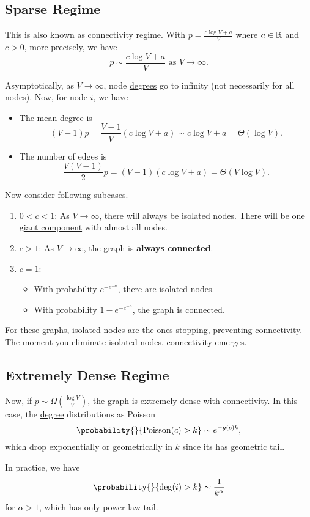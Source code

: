 \subsection{Sparse Regime}\label{subsec:sparse-regime}
This is also known as connectivity regime. With \(p = \frac{c\log V + a}{V}\) where \(a\in\mathbb{\MakeUppercase{R}}\) and \(c>0\),
more precisely, we have
\[
	p\sim \frac{c\log V + a}{V} \text{ as }V\to \infty.
\]

Asymptotically, as \(V\to \infty \), node \hyperref[def:degree]{degrees} go to infinity (not necessarily for all nodes). Now, for node \(i\), we have
\begin{itemize}
	\item The mean \hyperref[def:degree]{degree} is
	      \[
		      (V - 1)p = \frac{V-1}{V}(c\log V + a)\sim c\log V + a = \Theta(\log V).
	      \]
	\item The number of edges is
	      \[
		      \frac{V(V-1)}{2}p = (V - 1)(c\log V + a) = \Theta(V\log V).
	      \]
\end{itemize}

\begin{remark}
	Now consider following subcases.
	\begin{enumerate}
		\item \(0<c<1\): As \(V\to \infty \), there will always be isolated nodes. There will be one \hyperref[def:giant-component]{giant component} with almost all nodes.
		\item \(c>1\): As \(V\to \infty \), the \hyperref[def:graph]{graph} is \textbf{always connected}.
		\item \(c = 1\):
		      \begin{itemize}
			      \item With probability \(e^{-e^{-a}}\), there are isolated nodes.
			      \item With probability \(1 - e^{-e^{-a}}\), the \hyperref[def:graph]{graph} is \hyperref[def:connected]{connected}.
		      \end{itemize}
	\end{enumerate}
	For these \hyperref[def:graph]{graphs}, isolated nodes are the ones stopping, preventing \hyperref[def:connected]{connectivity}.
	The moment you eliminate isolated nodes, connectivity emerges.
\end{remark}

\subsection{Extremely Dense Regime}\label{subsec:extremely-dense-regime}
Now, if \(p\sim \Omega(\frac{\log V}{V})\), the \hyperref[def:graph]{graph} is extremely dense with \hyperref[def:connected]{connectivity}. In this case,
the \hyperref[def:degree]{degree} distributions as Poisson
\[
	\probability{}{\mathrm{Poisson}(c) > k} \sim e^{-g(c)k},
\]
which drop exponentially or geometrically in \(k\) since its has geometric tail.
\begin{remark}
	In practice, we have
	\[
		\probability{}{\deg(i) > k} \sim \frac{1}{k^\alpha }
	\]
	for \(\alpha > 1\), which has only power-law tail.
\end{remark}